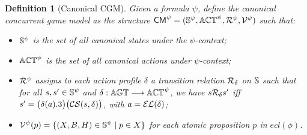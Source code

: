 \documentclass{article}
\newtheorem{definition}{Definition}
\begin{document}
\begin{definition}[Canonical CGM]\label{def: canonicalCGM}
  Given a formula $\psi $, define the canonical concurrent game model as the  structure $\mathsf{CM}^\psi = (\mathbb{S}^{\psi }, \mathbb{ACT}^{\psi }, \mathcal{R}^\psi, \mathcal{V}^\psi)$ such that: 
  \begin{itemize}
    \item $\mathbb{S}^{\psi }$ is the set of all canonical states under the  $\psi $-context;
    \item $\mathbb{ACT}^{\psi }$ is the set of all canonical actions under $\psi $-context;
    \item $\mathcal{R}^\psi $ assigns to each  action profile 
    $\delta $
    a transition relation
    $\mathcal{R}_\delta $ on $\mathbb{S}$ such that for all $s,s'\in\mathbb{S}^\psi$ and $\delta : \mathbb{AGT} \longrightarrow \mathbb{ACT}^{\psi }$, we have $s\mathcal{R}_\delta s'$ iff $s' = \big(\delta(a).3 \big)\big(\mathcal{CS}(s,\delta) \big)$, with  $a = \mathcal {EL}(\delta)$;
    \item $\mathcal{V}^\psi (p) = \{(X,B,H)\in \mathbb{S}^\psi \mid p\in X\}$ for each atomic proposition  $p$ in $ecl(\phi)$.
  \end{itemize} 
\end{definition}
\end{document}
